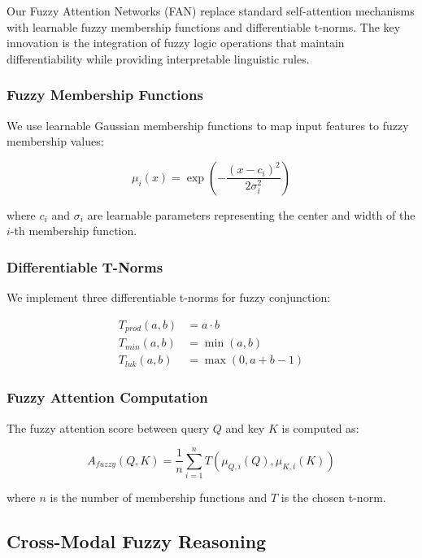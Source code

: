 \documentclass[manuscript,review,anonymous]{acmart}
\begin{document}
Our Fuzzy Attention Networks (FAN) replace standard self-attention mechanisms with learnable fuzzy membership functions and differentiable t-norms. The key innovation is the integration of fuzzy logic operations that maintain differentiability while providing interpretable linguistic rules.

\subsubsection{Fuzzy Membership Functions}

We use learnable Gaussian membership functions to map input features to fuzzy membership values:

\begin{equation}
\mu_i(x) = \exp\left(-\frac{(x - c_i)^2}{2\sigma_i^2}\right)
\end{equation}

where $c_i$ and $\sigma_i$ are learnable parameters representing the center and width of the $i$-th membership function.

\subsubsection{Differentiable T-Norms}

We implement three differentiable t-norms for fuzzy conjunction:

\begin{align}
T_{prod}(a, b) &= a \cdot b \\
T_{min}(a, b) &= \min(a, b) \\
T_{luk}(a, b) &= \max(0, a + b - 1)
\end{align}

\subsubsection{Fuzzy Attention Computation}

The fuzzy attention score between query $Q$ and key $K$ is computed as:

\begin{equation}
A_{fuzzy}(Q, K) = \frac{1}{n} \sum_{i=1}^{n} T(\mu_{Q,i}(Q), \mu_{K,i}(K))
\end{equation}

where $n$ is the number of membership functions and $T$ is the chosen t-norm.

\subsection{Cross-Modal Fuzzy Reasoning}
\end{document}
